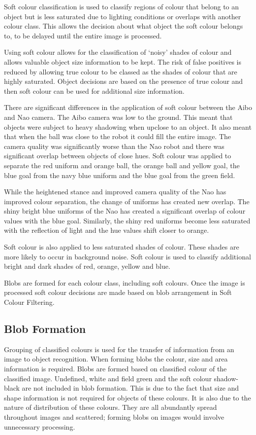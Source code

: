 Soft colour classification is used to classify regions of colour that belong to an object but is less saturated due to lighting conditions or overlaps with another colour class. This allows the decision about what object the soft colour belongs to, to be delayed until the entire image is processed.

Using soft colour allows for the classification of `noisy' shades of colour and allows valuable object size information to be kept. The risk of false positives is reduced by allowing true colour to be classed as the shades of colour that are highly saturated. Object decisions are based on the presence of true colour and then soft colour can be used for additional size information.

There are significant differences in the application of soft colour between the Aibo and Nao camera. The Aibo camera was low to the ground. This meant that objects were subject to heavy shadowing when upclose to an object. It also meant that when the ball was close to the robot it could fill the entire image. The camera quality was significantly worse than the Nao robot and there was significant overlap between objects of close hues. Soft colour was applied to separate the red uniform and orange ball, the orange ball and yellow goal, the blue goal from the navy blue uniform and the blue goal from the green field. 

While the heightened stance and improved camera quality of the Nao has improved colour separation, the change of uniforms has created new overlap. The shiny bright blue uniforms of the Nao has created a significant overlap of colour values with the blue goal. Similarly, the shiny red uniforms become less saturated with the reflection of light and the hue values shift closer to orange.

Soft colour is also applied to less saturated shades of colour. These shades are more likely to occur in background noise. Soft colour is used to classify additional bright and dark shades of red, orange, yellow and blue. 
 
Blobs are formed for each colour class, including soft colours. Once the image is processed soft colour decisions are made based on blob arrangement in Soft Colour Filtering. 

\subsection{Blob Formation}

Grouping of classified colours is used for the transfer of information from an image to object recognition. When forming blobs the colour, size and area information is required. Blobs are formed based on classified colour of the classified image. Undefined, white and field green and the soft colour shadow-black are not included in blob formation. This is due to the fact that size and shape information is not required for objects of these colours. It is also due to the nature of distribution of these colours. They are all abundantly spread throughout images and scattered; forming blobs on images would involve unnecessary processing. 

